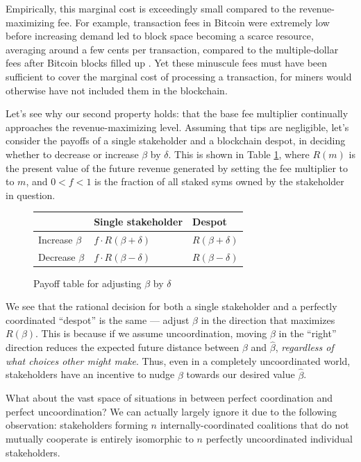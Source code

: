 \documentclass[letterpaper,12pt,oneside]{article}
\begin{document}
Empirically, this marginal cost is exceedingly small compared to the revenue-maximizing fee. For example, transaction fees in Bitcoin were extremely low before increasing demand led to block space becoming a scarce resource, averaging around a few cents per transaction, compared to the multiple-dollar fees after Bitcoin blocks filled up \cite{bccom}. Yet these minuscule fees must have been sufficient to cover the marginal cost of processing a transaction, for miners would otherwise have not included them in the blockchain.

Let's see why our second property holds: that the base fee multiplier continually approaches the revenue-maximizing level. Assuming that tips are negligible, let's consider the payoffs of a single stakeholder and a blockchain despot, in deciding whether to decrease or increase $\beta$ by $\delta$. This is shown in Table \ref{tab:payoff}, where $R(m)$ is the present value of the future revenue generated by setting the fee multiplier to to $m$, and $0<f<1$ is the fraction of all staked syms owned by the stakeholder in question.

\begin{figure}
    \centering
    \begin{tabular}{lll}
        \toprule
                         & Single stakeholder         & Despot              \\
        \midrule
        Increase $\beta$ & $f\cdot R(\beta + \delta)$ & $R(\beta + \delta)$ \\
        Decrease $\beta$ & $f\cdot R(\beta - \delta)$ & $R(\beta - \delta)$ \\
        \bottomrule
    \end{tabular}
    \caption{Payoff table for adjusting $\beta$ by $\delta$}
    \label{tab:payoff}
\end{figure}

We see that the rational decision for both a single stakeholder and a perfectly coordinated ``despot'' is the same --- adjust $\beta$ in the direction that maximizes $R(\beta)$. This is because if we assume uncoordination, moving $\beta$ in the ``right'' direction reduces the expected future distance between $\beta$ and $\hat{\beta}$, \emph{regardless of what choices other might make}. Thus, even in a completely uncoordinated world, stakeholders have an incentive to nudge $\beta$ towards our desired value $\hat{\beta}$.

What about the vast space of situations in between perfect coordination and perfect uncoordination? We can actually largely ignore it due to the following observation: stakeholders forming $n$ internally-coordinated coalitions that do not mutually cooperate is entirely isomorphic to $n$ perfectly uncoordinated individual stakeholders.
\end{document}
